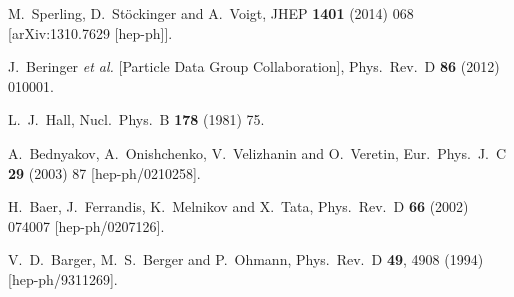 \documentclass[final,3p,11pt,pdflatex]{elsarticle}
\begin{document}
\begin{thebibliography}{100}
  M.~Sperling, D.~Stöckinger and A.~Voigt,
  JHEP {\bf 1401} (2014) 068
  [arXiv:1310.7629 [hep-ph]].

  J.~Beringer {\it et al.}  [Particle Data Group Collaboration],
  Phys.\ Rev.\ D {\bf 86} (2012) 010001.

  L.~J.~Hall,
  Nucl.\ Phys.\ B {\bf 178} (1981) 75.

  A.~Bednyakov, A.~Onishchenko, V.~Velizhanin and O.~Veretin,
  Eur.\ Phys.\ J.\ C {\bf 29} (2003) 87
  [hep-ph/0210258].

  H.~Baer, J.~Ferrandis, K.~Melnikov and X.~Tata,
  Phys.\ Rev.\ D {\bf 66} (2002) 074007
  [hep-ph/0207126].

  V.~D.~Barger, M.~S.~Berger and P.~Ohmann,
  Phys.\ Rev.\ D {\bf 49}, 4908 (1994)
  [hep-ph/9311269].


\end{thebibliography}
\end{document}
